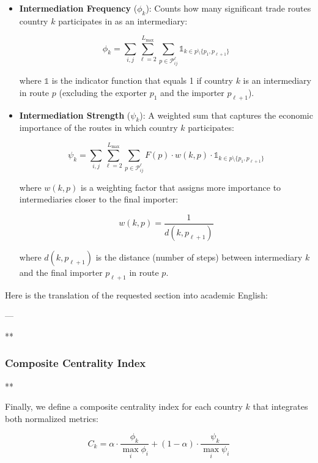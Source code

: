 \documentclass[final,1p,times,authoryear]{elsarticle}
\begin{document}
\begin{itemize}
    \item \textbf{Intermediation Frequency} ($\phi_k$): Counts how many significant trade routes country $k$ participates in as an intermediary:

    \begin{equation}
    \phi_k = \sum_{i,j} \sum_{\ell=2}^{L_{\max}} \sum_{p \in \mathcal{P}_{ij}^{\ell}} \mathbb{1}_{k \in p \setminus \{p_1, p_{\ell+1}\}}
    \end{equation}

    where $\mathbb{1}$ is the indicator function that equals 1 if country $k$ is an intermediary in route $p$ (excluding the exporter $p_1$ and the importer $p_{\ell+1}$).

    \item \textbf{Intermediation Strength} ($\psi_k$): A weighted sum that captures the economic importance of the routes in which country $k$ participates:

    \begin{equation}
    \psi_k = \sum_{i,j} \sum_{\ell=2}^{L_{\max}} \sum_{p \in \mathcal{P}_{ij}^{\ell}} F(p) \cdot w(k,p) \cdot \mathbb{1}_{k \in p \setminus \{p_1, p_{\ell+1}\}}
    \end{equation}

    where $w(k,p)$ is a weighting factor that assigns more importance to intermediaries closer to the final importer:

    \begin{equation}
    w(k,p) = \frac{1}{d(k, p_{\ell+1})}
    \end{equation}

    where $d(k, p_{\ell+1})$ is the distance (number of steps) between intermediary $k$ and the final importer $p_{\ell+1}$ in route $p$.
\end{itemize}

Here is the translation of the requested section into academic English:

---

**\subsubsection{Composite Centrality Index}**

Finally, we define a composite centrality index for each country $k$ that integrates both normalized metrics:

\begin{equation}
C_k = \alpha \cdot \frac{\phi_k}{\max_i \phi_i} + (1-\alpha) \cdot \frac{\psi_k}{\max_i \psi_i}
\end{equation}
\end{document}
